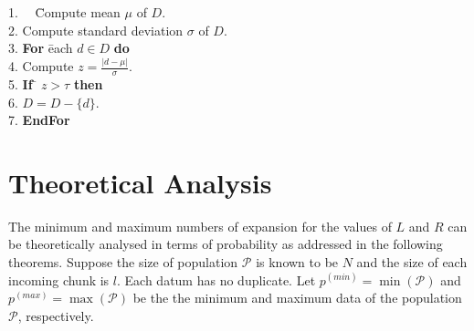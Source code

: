 \documentclass[a4paper,fleqn]{cas-dc}
\begin{document}
\begin{tabbing}
1.~~ \= Compute mean $\mu$ of $D$. \\
2.   \> Compute standard deviation $\sigma$ of $D$. \\
3.   \> {\bf For} \= each $d \in D$ {\bf do} \\
4.   \>           \> Compute $z = \frac{|d - \mu|}{\sigma}$. \\
5.   \>           \> {\bf If} \= $z > \tau$ {\bf then} \\
6.   \>           \>          \> $D = D - \{d\}$. \\
7.   \> {\bf EndFor}
\end{tabbing}

\section{Theoretical Analysis}
The minimum and maximum numbers of expansion for the values of $L$ and $R$ can be theoretically analysed
in terms of probability as addressed in the following theorems. Suppose the size of population 
$\mathcal{P}$ is known to be $N$ and the size of each incoming chunk is $l$. Each datum has no duplicate. 
Let $p^{(min)} = \min(\mathcal{P})$ and $p^{(max)} = \max(\mathcal{P})$ be the the minimum and maximum 
data of the population $\mathcal{P}$, respectively.
\end{document}

